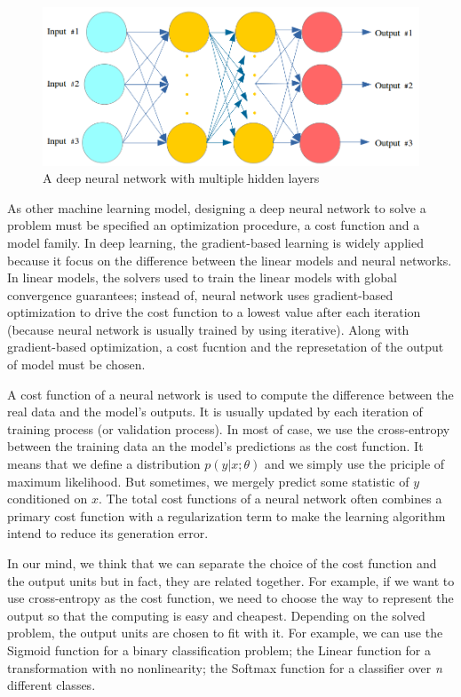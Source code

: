 \begin{figure}[h]
	\centering
	\includegraphics[scale=0.5]{images/deep_neural_network}
	\caption{A deep neural network with multiple hidden layers}
	\label{figndeepnetworks}
\end{figure}

As other machine learning model, designing a deep neural network to solve a problem must be specified an optimization procedure, a cost function and a model family. In deep learning, the gradient-based learning is widely applied because it focus on the difference between the linear models and neural networks. In linear models, the solvers used to train the linear models with global convergence guarantees; instead of, neural network uses gradient-based optimization to drive the cost function to a lowest value after each iteration (because neural network is usually trained by using iterative). Along with gradient-based optimization, a cost fucntion and the represetation of the output of model must be chosen.

A cost function of a neural network is used to compute the difference between the real data and the model's outputs. It is usually updated by each iteration of training process (or validation process). In most of case, we use the cross-entropy between the training data an the model's predictions as the cost function. It means that we define a distribution $p(y | x; \theta)$ and we simply use the priciple of maximum likelihood. But sometimes, we mergely predict some statistic of $y$ conditioned on $x$. The total cost functions of a neural network often combines a primary cost function with a regularization term to make the learning algorithm intend to reduce its generation error.

In our mind, we think that we can separate the choice of the cost function and the output units but in fact, they are related together. For example, if we want to use cross-entropy as the cost function, we need to choose the way to represent the output so that the computing is easy and cheapest. Depending on the solved problem, the output units are chosen to fit with it. For example, we can use the Sigmoid function for a binary classification problem; the Linear function for a transformation with no nonlinearity; the Softmax function for a classifier over \textit{n} different classes.
